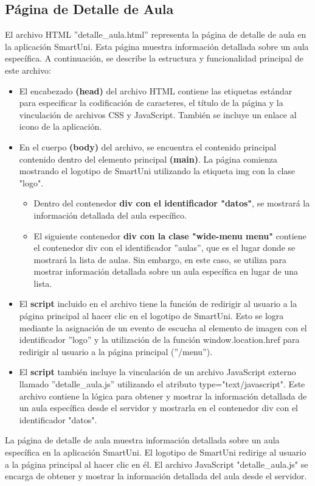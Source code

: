 \documentclass[12pt]{report}
\begin{document}
 \subsection{Página de Detalle de Aula}
El archivo HTML ''detalle\_aula.html'' representa la página de detalle de aula en la aplicación SmartUni. Esta página muestra información detallada sobre un aula específica. A continuación, se describe la estructura y funcionalidad principal de este archivo:

\begin{itemize}
    \item El encabezado \textbf{(head)} del archivo HTML contiene las etiquetas estándar para especificar la codificación de caracteres, el título de la página y la vinculación de archivos CSS y JavaScript. También se incluye un enlace al icono de la aplicación.

    \item En el cuerpo \textbf{(body)} del archivo, se encuentra el contenido principal contenido dentro del elemento principal \textbf{(main)}. La página comienza mostrando el logotipo de SmartUni utilizando la etiqueta img con la clase "logo".

    \begin{itemize}
        \item Dentro del contenedor \textbf{div con el identificador "datos"}, se mostrará la información detallada del aula específico.
        
        \item El siguiente contenedor \textbf{div con la clase "wide-menu menu"} contiene el contenedor div con el identificador ''aulas'', que es el lugar donde se mostrará la lista de aulas. Sin embargo, en este caso, se utiliza para mostrar información detallada sobre un aula específica en lugar de una lista.
    \end{itemize}

    \item El \textbf{script}  incluido en el archivo tiene la función de redirigir al usuario a la página principal al hacer clic en el logotipo de SmartUni. Esto se logra mediante la asignación de un evento de escucha al elemento de imagen con el identificador ''logo'' y la utilización de la función window.location.href para redirigir al usuario a la página principal (''/menu'').

    \item El \textbf{script} también incluye la vinculación de un archivo JavaScript externo llamado ''detalle\_aula.js'' utilizando el atributo type="text/javascript". Este archivo contiene la lógica para obtener y mostrar la información detallada de un aula específica desde el servidor y mostrarla en el contenedor div con el identificador "datos".
\end{itemize}
La página de detalle de aula muestra información detallada sobre un aula específica en la aplicación SmartUni. El logotipo de SmartUni redirige al usuario a la página principal al hacer clic en él. El archivo JavaScript "detalle\_aula.js" se encarga de obtener y mostrar la información detallada del aula desde el servidor.
\end{document}
